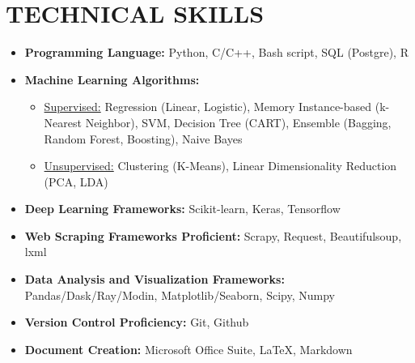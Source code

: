 
\section{TECHNICAL SKILLS}
\vspace{1mm}
\begin{itemize}[leftmargin=*]
    \item \textbf{Programming Language: } Python, C/C++, Bash script, SQL (Postgre), R
    \item \textbf{Machine Learning Algorithms: }
    \begin{itemize}
        \item \underline{Supervised:} Regression (Linear, Logistic), Memory Instance-based (k-Nearest Neighbor), SVM, Decision Tree (CART), Ensemble (Bagging, Random Forest, Boosting), Naive Bayes
        \item \underline{Unsupervised:} Clustering (K-Means), Linear Dimensionality Reduction (PCA, LDA)
    \end{itemize}
    \item \textbf{Deep Learning Frameworks: } Scikit-learn, Keras, Tensorflow
    \item \textbf{Web Scraping Frameworks Proficient: } Scrapy, Request, Beautifulsoup, lxml
    \item \textbf{Data Analysis and Visualization Frameworks:} Pandas/Dask/Ray/Modin, Matplotlib/Seaborn, Scipy, Numpy
    \item \textbf{Version Control Proficiency: } Git, Github
    \item \textbf{Document Creation: } Microsoft Office Suite, LaTeX, Markdown
    
\end{itemize}